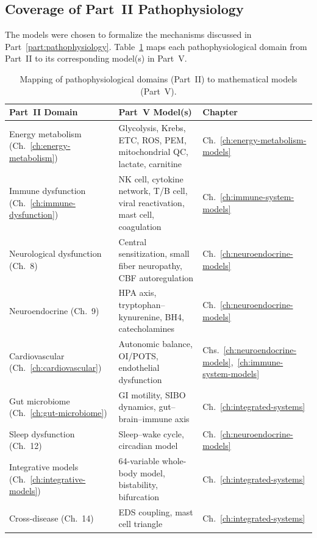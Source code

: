 \subsection{Coverage of Part~II Pathophysiology}

The models were chosen to formalize the mechanisms discussed in Part~\ref{part:pathophysiology}. Table~\ref{tab:model-coverage} maps each pathophysiological domain from Part~II to its corresponding model(s) in Part~V.

\begin{table}[htbp]
\centering
\caption{Mapping of pathophysiological domains (Part~II) to mathematical models (Part~V).}
\label{tab:model-coverage}
\small
\begin{tabular}{p{4.5cm} p{5cm} p{4cm}}
\toprule
\textbf{Part~II Domain} & \textbf{Part~V Model(s)} & \textbf{Chapter} \\
\midrule
Energy metabolism (Ch.~\ref{ch:energy-metabolism}) & Glycolysis, Krebs, ETC, ROS, PEM, mitochondrial QC, lactate, carnitine & Ch.~\ref{ch:energy-metabolism-models} \\
\addlinespace
Immune dysfunction (Ch.~\ref{ch:immune-dysfunction}) & NK cell, cytokine network, T/B cell, viral reactivation, mast cell, coagulation & Ch.~\ref{ch:immune-system-models} \\
\addlinespace
Neurological dysfunction (Ch.~8) & Central sensitization, small fiber neuropathy, CBF autoregulation & Ch.~\ref{ch:neuroendocrine-models} \\
\addlinespace
Neuroendocrine (Ch.~9) & HPA axis, tryptophan--kynurenine, BH4, catecholamines & Ch.~\ref{ch:neuroendocrine-models} \\
\addlinespace
Cardiovascular (Ch.~\ref{ch:cardiovascular}) & Autonomic balance, OI/POTS, endothelial dysfunction & Chs.~\ref{ch:neuroendocrine-models},~\ref{ch:immune-system-models} \\
\addlinespace
Gut microbiome (Ch.~\ref{ch:gut-microbiome}) & GI motility, SIBO dynamics, gut--brain--immune axis & Ch.~\ref{ch:integrated-systems} \\
\addlinespace
Sleep dysfunction (Ch.~12) & Sleep--wake cycle, circadian model & Ch.~\ref{ch:neuroendocrine-models} \\
\addlinespace
Integrative models (Ch.~\ref{ch:integrative-models}) & 64-variable whole-body model, bistability, bifurcation & Ch.~\ref{ch:integrated-systems} \\
\addlinespace
Cross-disease (Ch.~14) & EDS coupling, mast cell triangle & Ch.~\ref{ch:integrated-systems} \\
\bottomrule
\end{tabular}
\end{table}

